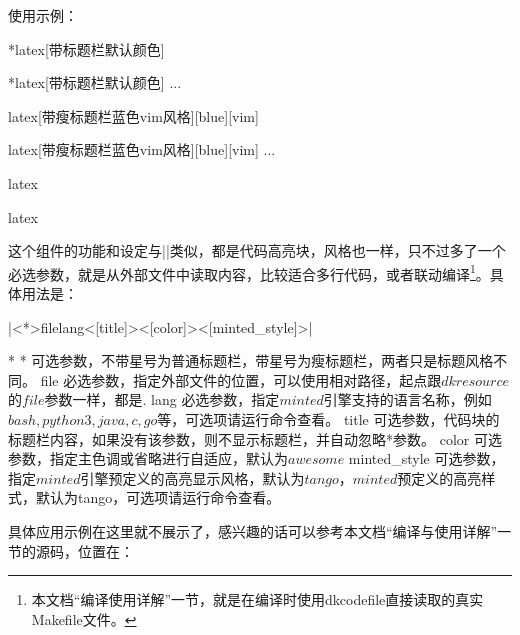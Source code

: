 使用示例：

\begin{dkcode}*{latex}[带标题栏默认颜色]
\begin{dkcode}*{latex}[带标题栏默认颜色]
  ...
\end{dkcode}

\begin{dkcode}{latex}[带瘦标题栏蓝色vim风格][blue][vim]
\begin{dkcode}{latex}[带瘦标题栏蓝色vim风格][blue][vim]
  ...
\end{dkcode}

\begin{dkcode}{latex}
\begin{dkcode}{latex}
\end{dkcode}

这个组件的功能和设定与|\dkcode|类似，都是代码高亮块，风格也一样，只不过多了一个必选参数，就是从外部文件中读取内容，比较适合多行代码，或者联动编译\footnote{本文档“编译使用详解”一节，就是在编译时使用dkcodefile直接读取的真实Makefile文件。}。具体用法是：

|\dkcodefile<*>{file}{lang}<[title]><[color]><[minted_style]>|

\begin{cvskills}*
  \cvskill
  {*}
  {可选参数，不带星号为普通标题栏，带星号为瘦标题栏，两者只是标题风格不同。}
  \cvskill
  {file}
  {必选参数，指定外部文件的位置，可以使用相对路径，起点跟$dkresource$的$file$参数一样，都是.}
  \cvskill
  {lang}
  {必选参数，指定$minted$引擎支持的语言名称，例如$bash, python3, java, c, go$等，可选项请运行命令查看。}
  \cvskill
  {title}
  {可选参数，代码块的标题栏内容，如果没有该参数，则不显示标题栏，并自动忽略*参数。}
  \cvskill
  {color}
  {可选参数，指定主色调或省略进行自适应，默认为$awesome$}
  \cvskill
  {minted\_style}
  {可选参数，指定$minted$引擎预定义的高亮显示风格，默认为$tango$，$minted$预定义的高亮样式，默认为tango，可选项请运行命令查看。}
\end{cvskills}


具体应用示例在这里就不展示了，感兴趣的话可以参考本文档“编译与使用详解”一节的源码，位置在：



\end{dkcode}
\end{dkcode}
\end{dkcode}
